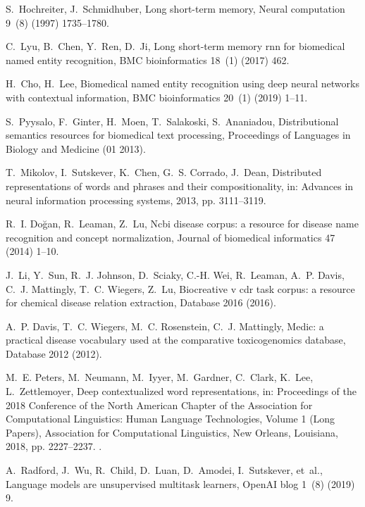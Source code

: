 \documentclass[preprint,12pt]{elsarticle}
\begin{document}
\begin{thebibliography}{10}
S.~Hochreiter, J.~Schmidhuber, Long short-term memory, Neural computation 9~(8)
  (1997) 1735--1780.

C.~Lyu, B.~Chen, Y.~Ren, D.~Ji, Long short-term memory rnn for biomedical named
  entity recognition, BMC bioinformatics 18~(1) (2017) 462.

H.~Cho, H.~Lee, Biomedical named entity recognition using deep neural networks
  with contextual information, BMC bioinformatics 20~(1) (2019) 1--11.

S.~Pyysalo, F.~Ginter, H.~Moen, T.~Salakoski, S.~Ananiadou, Distributional
  semantics resources for biomedical text processing, Proceedings of Languages
  in Biology and Medicine (01 2013).

T.~Mikolov, I.~Sutskever, K.~Chen, G.~S. Corrado, J.~Dean, Distributed
  representations of words and phrases and their compositionality, in: Advances
  in neural information processing systems, 2013, pp. 3111--3119.

R.~I. Do{\u{g}}an, R.~Leaman, Z.~Lu, Ncbi disease corpus: a resource for
  disease name recognition and concept normalization, Journal of biomedical
  informatics 47 (2014) 1--10.

J.~Li, Y.~Sun, R.~J. Johnson, D.~Sciaky, C.-H. Wei, R.~Leaman, A.~P. Davis,
  C.~J. Mattingly, T.~C. Wiegers, Z.~Lu, Biocreative v cdr task corpus: a
  resource for chemical disease relation extraction, Database 2016 (2016).

A.~P. Davis, T.~C. Wiegers, M.~C. Rosenstein, C.~J. Mattingly, Medic: a
  practical disease vocabulary used at the comparative toxicogenomics database,
  Database 2012 (2012).

M.~E. Peters, M.~Neumann, M.~Iyyer, M.~Gardner, C.~Clark, K.~Lee,
  L.~Zettlemoyer, Deep contextualized word representations, in: Proceedings of
  the 2018 Conference of the North {A}merican Chapter of the Association for
  Computational Linguistics: Human Language Technologies, Volume 1 (Long
  Papers), Association for Computational Linguistics, New Orleans, Louisiana,
  2018, pp. 2227--2237.
\newblock \href {https://doi.org/10.18653/v1/N18-1202}
  {}.

A.~Radford, J.~Wu, R.~Child, D.~Luan, D.~Amodei, I.~Sutskever, et~al., Language
  models are unsupervised multitask learners, OpenAI blog 1~(8) (2019) 9.


\end{thebibliography}
\end{document}
